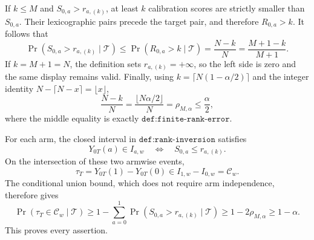 If \(k\le M\) and \(S_{0,a}>r_{a,(k)}\), at least \(k\) calibration scores are strictly smaller than \(S_{0,a}\). Their lexicographic pairs precede the target pair, and therefore \(R_{0,a}>k\). It follows that
\[
\Pr(S_{0,a}>r_{a,(k)}\mid\mathcal T)\le\Pr(R_{0,a}>k\mid\mathcal T)=\frac{N-k}{N}=\frac{M+1-k}{M+1}.
\]
If \(k=M+1=N\), the definition sets \(r_{a,(k)}=+\infty\), so the left side is zero and the same display remains valid. Finally, using \(k=\lceil N(1-\alpha/2)\rceil\) and the integer identity \(N-\lceil N-x\rceil=\lfloor x\rfloor\),
\[
\frac{N-k}{N}=\frac{\lfloor N\alpha/2\rfloor}{N}=\rho_{M,\alpha}\le\frac{\alpha}{2},
\]
where the middle equality is exactly \(\texttt{def:finite-rank-error}\).

For each arm, the closed interval in \(\texttt{def:rank-inversion}\) satisfies
\[
Y_{0T}(a)\in I_{a,w}\quad\Longleftrightarrow\quad S_{0,a}\le r_{a,(k)}.
\]
On the intersection of these two armwise events,
\[
\tau_T=Y_{0T}(1)-Y_{0T}(0)\in I_{1,w}-I_{0,w}=\mathcal C_w.
\]
The conditional union bound, which does not require arm independence, therefore gives
\[
\Pr(\tau_T\in\mathcal C_w\mid\mathcal T)\ge1-\sum_{a=0}^1\Pr(S_{0,a}>r_{a,(k)}\mid\mathcal T)\ge1-2\rho_{M,\alpha}\ge1-\alpha.
\]
This proves every assertion.